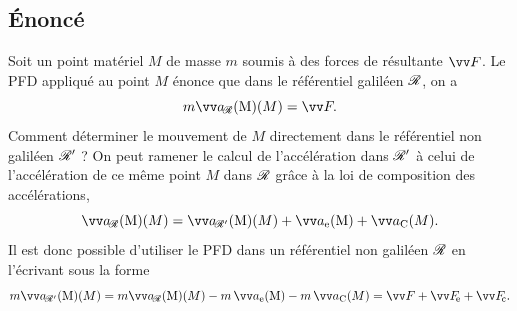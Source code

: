 \documentclass[12pt,fancy]{cours}
\begin{document}
\subsection{Énoncé}
Soit un point matériel $M$ de masse $m$ soumis à des forces %
de résultante $\F$. Le \ac{PFD} appliqué au point $M$ énonce que dans le référentiel galiléen $\mathcal{R}$, on a
\begin{equation}
m\aR(M)=\F.
\end{equation}
Comment déterminer le mouvement de $M$ directement dans le référentiel non galiléen $\mathcal{R}'$ ?
On peut ramener le calcul de l'accélération dans $\mathcal{R}'$ à celui de l'accélération de ce même point $M$ dans $\mathcal{R}$ grâce à la loi de composition des accélérations,
\begin{equation}
\aR(M) = \aRp(M) + \ae + \aC.
\end{equation}
Il est donc possible d'utiliser le \ac{PFD} dans un référentiel non galiléen $\mathcal{R}$ en l'écrivant sous la forme
\begin{equation}
m\aRp(M)  = m\aR(M)-m\,\ae -m\,\aC = \F+\Fe+\Fc.
\end{equation}
\end{document}
